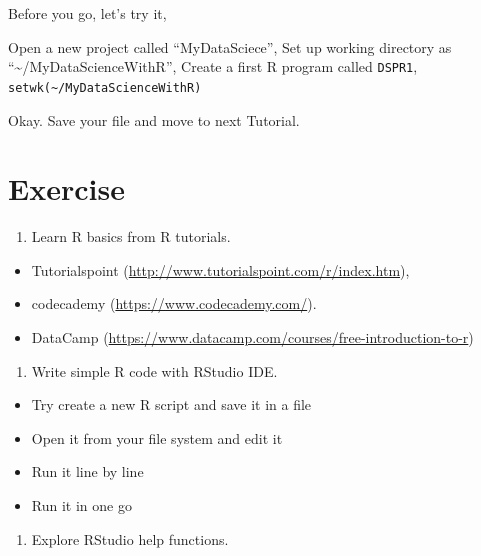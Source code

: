 \documentclass[
]{book}
\providecommand{\tightlist}{%
  \setlength{\itemsep}{0pt}\setlength{\parskip}{0pt}}
\begin{document}
Before you go, let's try it,

\begin{rmdact}
Open a new project called ``MyDataSciece'',
Set up working directory as ``\textasciitilde/MyDataScienceWithR'',
Create a first R program called \texttt{DSPR1},
\texttt{setwk(\textasciitilde{}/MyDataScienceWithR)}
\end{rmdact}

Okay. Save your file and move to next Tutorial.

\hypertarget{exercise-1}{%
\section*{Exercise}\label{exercise-1}}


\begin{enumerate}
\def\labelenumi{\arabic{enumi}.}
\tightlist
\item
  Learn R basics from R tutorials.
\end{enumerate}

\begin{itemize}
\tightlist
\item
  Tutorialspoint (\url{http://www.tutorialspoint.com/r/index.htm}),
\item
  codecademy (\url{https://www.codecademy.com/}).
\item
  DataCamp (\url{https://www.datacamp.com/courses/free-introduction-to-r})
\end{itemize}

\begin{enumerate}
\def\labelenumi{\arabic{enumi}.}
\setcounter{enumi}{1}
\tightlist
\item
  Write simple R code with RStudio IDE.
\end{enumerate}

\begin{itemize}
\tightlist
\item
  Try create a new R script and save it in a file
\item
  Open it from your file system and edit it
\item
  Run it line by line
\item
  Run it in one go
\end{itemize}

\begin{enumerate}
\def\labelenumi{\arabic{enumi}.}
\setcounter{enumi}{2}
\tightlist
\item
  Explore RStudio help functions.
\end{enumerate}
\end{document}

